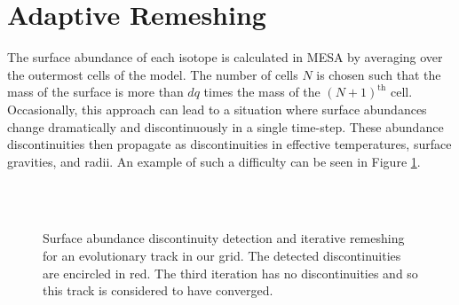 \documentclass[manuscript]{aastex}
\begin{document}
\begin{figure*}
    \centering
    \caption{Methods of generating multidimensional grids as portrayed via a unit cube projected onto a unit square. Linear (left), random (middle), and quasi-random (right) grids are generated in three dimensions, with color depicting the third dimension, i.e., the distance between the reader and the screen. Linear grids exhaust each dimension uniformly, but with all points stacked on top of each other, so the unit cube is filled very slowly and each point bears redundant information, which is why all of the (stacked) points appear black. Random grids fill the unit cube more rapidly, but points tend to clump up and leave large gaps in the parameter space. Quasi-random grids achieve the best of both worlds and fill the unit cube most rapidly by generating points that are maximally distant along all dimensions. From top to bottom, all three methods are shown with 100, 400, and 2000 points generated, respectively. }%
    \label{fig:grids}
\end{figure*}

\section{Adaptive Remeshing}
\label{sec:remeshing}

The surface abundance of each isotope is calculated in MESA by averaging over the outermost cells of the model. The number of cells $N$ is chosen such that the mass of the surface is more than $dq$ times the mass of the $(N+1)^{\text{th}}$ cell. Occasionally, this approach can lead to a situation where surface abundances change dramatically and discontinuously in a single time-step. These abundance discontinuities then propagate as discontinuities in effective temperatures, surface gravities, and radii. An example of such a difficulty can be seen in Figure \ref{fig:discontinuity}. 

\begin{figure}
    \centering
    \\
    \\
    \caption{Surface abundance discontinuity detection and iterative remeshing for an evolutionary track in our grid. The detected discontinuities are encircled in red. The third iteration has no discontinuities and so this track is considered to have converged. }
    \label{fig:discontinuity}
\end{figure}
\end{document}
